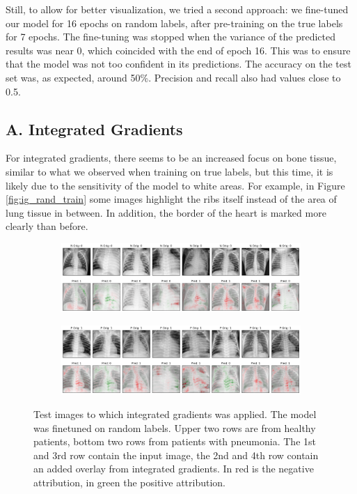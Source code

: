 Still, to allow for better visualization, we tried a second approach: we fine-tuned our model for 16 epochs on random labels, after pre-training on the true labels for 7 epochs. The fine-tuning was stopped when the variance of the predicted results was near 0, which coincided with the end of epoch 16. This was to ensure that the model was not too confident in its predictions.
The accuracy on the test set was, as expected, around 50\%. Precision and recall also had values close to 0.5.

\subsection*{A. Integrated Gradients}

For integrated gradients, there seems to be an increased focus on bone tissue, similar to what we observed when training on true labels, but this time, it is likely due to the sensitivity of the model to white areas. For example, in Figure \ref{fig:ig_rand_train} some images highlight the ribs itself instead of the area of lung tissue in between. In addition, the border of the heart is marked more clearly than before.

\begin{figure}
    \centering
    \begin{subfigure}{\columnwidth}
        \includegraphics[width=1\textwidth]{images/ig_rand_test.png}
    \end{subfigure}
    \centering
    \begin{subfigure}{\columnwidth}
        \includegraphics[width=1\textwidth]{images/ig_rand_test_P.png}
    \end{subfigure}
    \caption{Test images to which integrated gradients was applied. The model was finetuned on random labels. Upper two rows are from healthy patients, bottom two rows from patients with pneumonia. The 1st and 3rd row contain the input image, the 2nd and 4th row contain an added overlay from integrated gradients. In red is the negative attribution, in green the positive attribution.}
    \label{fig:ig_rand_test}
\end{figure}


